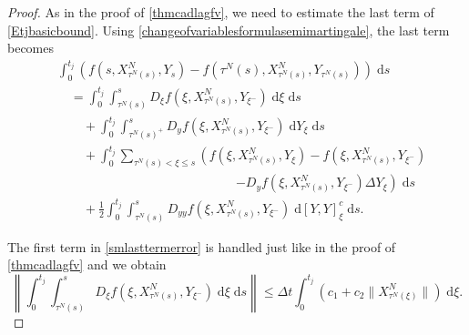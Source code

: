 \documentclass[reqno,12pt]{amsart}
\theoremstyle{plain} %
\theoremstyle{definition} %
\begin{document}
\begin{proof}
    As in the proof of \eqref{thmcadlagfv}, we need to estimate the last term of \eqref{Etjbasicbound}. Using \eqref{changeofvariablesformulasemimartingale}, the last term becomes
    \begin{equation}
        \label{smlasttermerror}
        \begin{aligned}
            & \int_0^{t_j} \left( f(s, X_{\tau^N(s)}^N, Y_s) - f(\tau^N(s), X_{\tau^N(s)}^N, Y_{\tau^N(s)}) \right)\;\mathrm{d}s \\
            & \quad = \int_0^{t_j} \int_{\tau^N(s)}^s D_\xi f(\xi, X_{\tau^N(s)}^N, Y_{\xi^-})\;\mathrm{d}\xi \;\mathrm{d}s \\
            & \qquad + \int_0^{t_j} \int_{\tau^N(s)^+}^s D_y f(\xi, X_{\tau^N(s)}^N, Y_{\xi^-}) \;\mathrm{d}Y_\xi \;\mathrm{d}s \\
            & \qquad + \int_0^{t_j} \sum_{\tau^N(s) < \xi \leq s} \left(f(\xi, X_{\tau^N(s)}^N, Y_\xi) - f(\xi, X_{\tau^N(s)}^N, Y_{\xi^{-}}) \right. \\
            & \qquad \qquad \qquad \qquad \qquad \qquad \qquad \left. - D_y f(\xi, X_{\tau^N(s)}^N, Y_{\xi^-})\Delta Y_\xi\right) \;\mathrm{d}s \\ 
            & \qquad + \frac{1}{2} \int_0^{t_j} \int_{\tau^N(s)}^s D_{yy}f(\xi, X_{\tau^N(s)}^N, Y_{\xi^-})\;\mathrm{d}[Y, Y]_\xi^c\;\mathrm{d}s.
        \end{aligned}
    \end{equation}
    
    The first term in \eqref{smlasttermerror} is handled just like in the proof of \cref{thmcadlagfv} and we obtain
    \[
        \left\|\int_0^{t_j} \int_{\tau^N(s)}^s D_\xi f(\xi, X_{\tau^N(s)}^N, Y_{\xi^-})\;\mathrm{d}\xi\;\mathrm{d}s\right\| \leq \Delta t\int_0^{t_j} \left(c_1 + c_2 \|X_{\tau^N(\xi)}^N\|\right)\;\mathrm{d}\xi.
    \]


\end{proof}
\end{document}
